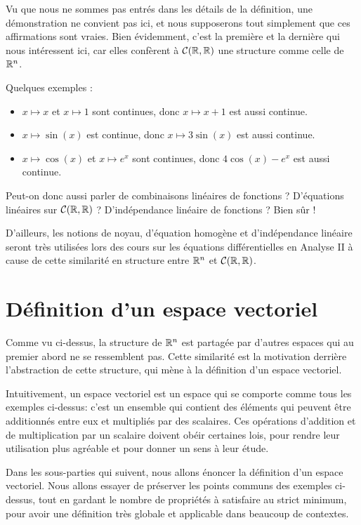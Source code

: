 Vu que nous ne sommes pas entrés dans les détails de la définition, une démonstration ne convient pas ici, et nous supposerons tout simplement que ces affirmations sont vraies. Bien évidemment, c'est la première et la dernière qui nous intéressent ici, car elles confèrent à $\mathcal{C}(\mathbb{R},\mathbb{R})$ une structure comme celle de $\mathbb{R}^n$.

Quelques exemples :

\begin{itemize}
    \item $x \mapsto x$ et $x \mapsto 1$ sont continues, donc $x \mapsto x + 1$ est aussi continue.
    \item $x \mapsto \sin(x)$ est continue, donc $x \mapsto 3\sin(x)$ est aussi continue.
    \item $x \mapsto \cos(x)$ et $x \mapsto e^x$ sont continues, donc  $4\cos(x) - e^x$ est aussi continue.
\end{itemize}

Peut-on donc aussi parler de combinaisons linéaires de fonctions ? D'équations linéaires sur $\mathcal{C}(\mathbb{R},\mathbb{R})$ ? D'indépendance linéaire de fonctions ? Bien sûr !

D'ailleurs, les notions de noyau, d'équation homogène et d'indépendance linéaire seront très utilisées lors des cours sur les équations différentielles en Analyse II à cause de cette similarité en structure entre $\mathbb{R}^n$ et $\mathcal{C}(\mathbb{R},\mathbb{R})$.

\section{Définition d’un espace vectoriel} \label{sec:def_ev}
Comme vu ci-dessus, la structure de $\mathbb{R}^n$ est partagée par d'autres espaces qui au premier abord ne se ressemblent pas. Cette similarité est la motivation derrière l'abstraction de cette structure, qui mène à la définition d'un espace vectoriel.

Intuitivement, un espace vectoriel est un espace qui se comporte comme tous les exemples ci-dessus: c'est un ensemble qui contient des éléments qui peuvent être additionnés entre eux et multipliés par des scalaires. Ces opérations d'addition et de multiplication par un scalaire doivent obéir certaines lois, pour rendre leur utilisation plus agréable et pour donner un sens à leur étude.

Dans les sous-parties qui suivent, nous allons énoncer la définition d'un espace vectoriel. Nous allons essayer de préserver les points communs des exemples ci-dessus, tout en gardant le nombre de propriétés à satisfaire au strict minimum, pour avoir une définition très globale et applicable dans beaucoup de contextes.


